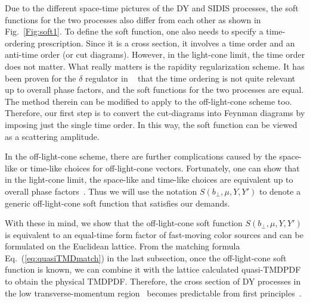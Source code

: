 Due to the different space-time pictures of the DY and SIDIS processes, the soft functions for the two processes also differ from each other as shown in Fig.~\ref{Fig:soft1}. To define the soft function, one also needs to specify a time-ordering prescription. Since it is a cross section, it involves a time order and an anti-time order (or cut diagrams). However, in the light-cone limit, the time order does not matter.
What really matters is the rapidity regularization scheme. It has been proven for the $\delta$ regulator in ~\cite{Vladimirov:2017ksc} that the time ordering is not quite relevant up to overall phase factors, and the soft functions for the two processes are equal. The method therein can be modified to apply to the off-light-cone scheme too. Therefore, our first step is to convert the cut-diagrams into Feynman diagrams by imposing just
the single time order. In this way, the soft function can be viewed as a scattering amplitude.

In the off-light-cone scheme, there are further complications caused by the space-like or
time-like choices for off-light-cone vectors. Fortunately, one can show that in the light-cone limit, the space-like and time-like choices
are equivalent up to overall phase factors~\cite{future}. Thus we will use the notation $S(b_\perp,\mu,Y,Y')$ to denote a generic off-light-cone soft function that satisfies our demands.

With these in mind, we show that the off-light-cone soft function $S(b_\perp,\mu,Y,Y')$ is equivalent to an equal-time form factor of fast-moving color sources and can be formulated on the Euclidean lattice. From the matching formula Eq.~(\ref{eq:quasiTMDmatch}) in the last subsection, once the off-light-cone soft function is known, we can combine it with the lattice calculated quasi-TMDPDF to obtain the physical TMDPDF. Therefore, the cross section of DY processes in the low transverse-momentum region~\cite{Collins:1984kg} becomes predictable from first principles~\cite{Ji:2019sxk}.

